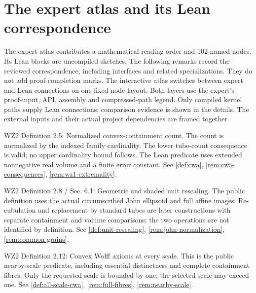 \chapter{The expert atlas and its Lean correspondence}
\label{chap:atlas-correspondence}

The expert atlas contributes a mathematical reading order and 102 named nodes.
Its Lean blocks are uncompiled sketches. The following remarks record the
reviewed correspondence, including interfaces and related specializations.
They do not add proof-completion marks. The interactive atlas switches between
expert and Lean connections on one fixed node layout. Both layers use the
expert's proof-input, API, assembly and compressed-path legend. Only compiled
kernel paths supply Lean connections; comparison evidence is shown in the details.
The external inputs and their actual project dependencies are framed together.

\begin{remark}
\label{rem:atlas-W2CWA}
WZ2 Definition 2.5: Normalized convex-containment count.
The count is normalized by the indexed family cardinality. The lower tube-count consequence is valid; no upper cardinality bound follows. The Lean predicate uses extended nonnegative real volume and a finite error constant.
See \ref{def:cwa}, \ref{rem:cwa-consequences}, \ref{rem:wz1-extremality}.
\end{remark}

\begin{remark}
\label{rem:atlas-W2Unit}
WZ2 Definition 2.8 / Sec. 6.1: Geometric and shaded unit rescaling.
The public definition uses the actual circumscribed John ellipsoid and full affine images. Re-cubulation and replacement by standard tubes are later constructions with separate containment and volume comparisons; the two operations are not identified by definition.
See \ref{def:unit-rescaling}, \ref{rem:john-normalization}, \ref{rem:common-grains}.
\end{remark}

\begin{remark}
\label{rem:atlas-W2MW}
WZ2 Definition 2.12: Convex Wolff axioms at every scale.
This is the public nearby-scale predicate, including essential distinctness and complete containment fibres. Only the requested scale is bounded by one; the selected scale may exceed one.
See \ref{def:all-scale-cwa}, \ref{rem:full-fibres}, \ref{rem:nearby-scale}.
\end{remark}

